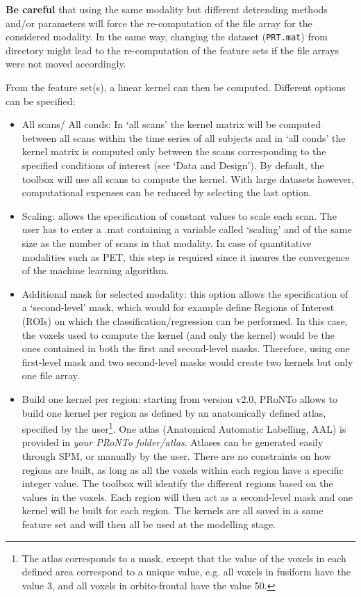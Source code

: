 {\bf Be careful} that using the same modality but different detrending methods and/or parameters will force the re-computation of the file array for the considered modality. In the same way, changing the dataset ({\tt PRT.mat}) from directory might lead to the re-computation of the feature sets if the file arrays were not moved accordingly. 

From the feature set(s), a linear kernel can then be computed. Different options can be specified:
\begin{itemize}
\item All scans/ All conds: In `all scans' the kernel matrix will be computed between all scans within the time series of all subjects and in `all
conds' the kernel matrix is computed only between the scans corresponding to the specified conditions of interest (see `Data and Design'). By default, the toolbox will use all scans to compute the kernel. With large datasets however, computational expenses can be reduced by selecting the last option. 
\item Scaling: allows the specification of constant values to scale each scan. The user has to enter a .mat containing a variable called `scaling' and of the same size as the number of scans in that modality. In case of quantitative modalities such as PET, this step is required since it insures the convergence of the machine learning algorithm.
\item Additional mask for selected modality: this option allows  the specification of a `second-level' mask, which would for example define Regions of Interest (ROIs) on which the classification/regression can be performed. In this case, the voxels used to compute the kernel (and only the kernel) would be the ones contained in both the first and second-level masks. Therefore, using one first-level mask and two second-level masks would create two kernels but only one file array.
\item Build one kernel per region: starting from version v2.0, PRoNTo allows to build one kernel per region as defined by an anatomically defined atlas, specified by the user\footnote{The atlas corresponds to a mask, except that the value of the voxels in each defined area correspond to a unique value, e.g. all voxels in fusiform have the value 3, and all voxels in orbito-frontal have the value 50.}. One atlas (Anatomical Automatic Labelling, AAL) is provided in \textit{your PRoNTo folder/atlas}. Atlases can be generated easily through SPM, or manually by the user. There are no constraints on how regions are built, as long as all the voxels within each region have a specific integer value. The toolbox will identify the different regions based on the values in the voxels. Each region will then act as a second-level mask and one kernel will be built for each region. The kernels are all saved in a same feature set and will then all be used at the modelling stage.
\end{itemize}

